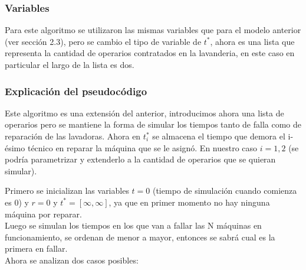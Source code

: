 \documentclass[11pt, spanish, a4paper]{article}
\begin{document}
\subsubsection{Variables}
Para este algoritmo se utilizaron las mismas variables que para el modelo anterior (ver secci\'on 2.3), pero se cambio el tipo de variable de $t^*$, ahora es una lista que representa la cantidad de operarios contratados en la lavanderia, en este caso en particular el largo de la lista es dos.\\

\subsubsection{Explicaci\'on del pseudoc\'odigo}
Este algoritmo es una extensi\'on del anterior, introducimos ahora una lista de operarios pero se mantiene la forma de simular los tiempos tanto de falla como de reparaci\'on de las lavadoras.
Ahora en $t^*_i$ se almacena el tiempo que demora el i-\'esimo t\'ecnico en reparar la m\'aquina que se le asign\'o. En nuestro caso $i=1,2$ (se podr\'ia parametrizar y extenderlo a la cantidad de operarios que se quieran simular).

Primero se inicializan las variables $t = 0$ (tiempo de simulaci\'on cuando comienza es 0) y $r = 0$ y $t^* = [\infty, \infty]$, ya que en primer momento no hay ninguna m\'aquina por reparar.\\
Luego se simulan los tiempos en los que van a fallar las N m\'aquinas en funcionamiento, se ordenan de menor a mayor, entonces se sabr\'a cual es la primera en fallar.\\
Ahora se analizan dos casos posibles:\\
\end{document}
